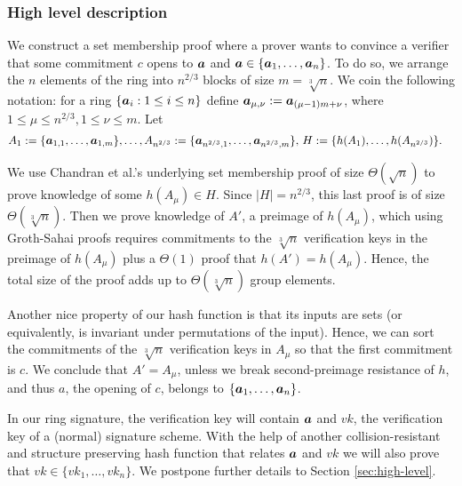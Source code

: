 \subsubsection{High level description}
We construct a set membership proof where a prover wants to convince a verifier that some commitment $c$ opens to ${\boldsymbol{a}}$ and ${\boldsymbol{a}}\in\{{\boldsymbol{a}}_1,\ldots,{\boldsymbol{a}}_n\}$. To do so, we arrange the $n$ elements of the ring into $n^{2/3}$ blocks of size $m=\sqrt[3]{n}$. We coin the following notation: for a ring $\{{\boldsymbol{a}}_i:1\leq i \leq n\}$ define ${\boldsymbol{a}}_{\mu,\nu}:={\boldsymbol{a}}_{(\mu-1)m+\nu}$, where  $1\leq\mu\leq n^{2/3},1\leq \nu\leq m$.  Let
\begin{align*}
& A_1 := \{{\boldsymbol{a}}_{1,1},\ldots,{\boldsymbol{a}}_{1,m}\},\ldots, A_{n^{2/3}} := \{{\boldsymbol{a}}_{n^{2/3},1},\ldots,{\boldsymbol{a}}_{n^{2/3},m}\},\,
H:=\{h(A_1),\ldots,\allowbreak h(A_{n^{2/3}})\}.
\end{align*}

We use Chandran et al.'s underlying set membership proof of size $\Theta(\sqrt{n})$ to prove knowledge of some $h(A_\mu)\in H$. Since $|H|=n^{2/3}$, this last proof is of size $\Theta(\sqrt[3]{n})$. Then we prove knowledge of $A'$, a preimage of $h(A_\mu)$, which using Groth-Sahai proofs requires commitments to the $\sqrt[3]{n}$ verification keys in the preimage of $h(A_\mu)$ plus a $\Theta(1)$ proof that $h(A')=h(A_\mu)$. Hence, the total size of the proof adds up to $\Theta(\sqrt[3]{n})$ group elements.

Another nice property of our hash function is that its inputs are sets (or equivalently, is invariant under permutations of the input). Hence, we can sort the commitments of the $\sqrt[3]{n}$ verification keys in $A_\mu$ so that the first commitment is $c$. We conclude that $A'=A_\mu$, unless we break second-preimage resistance of $h$, and thus $a$, the opening of $c$, belongs to $\{{\boldsymbol{a}}_1,\ldots,{\boldsymbol{a}}_n\}$.

In our ring signature, the verification key will contain ${\boldsymbol{a}}$ and $vk$, the verification key of a (normal) signature scheme. With the help of another collision-resistant and structure preserving hash function that relates ${\boldsymbol{a}}$ and $vk$ we will also prove that $vk\in\{vk_1,\ldots,vk_n\}$. We postpone further details to Section \ref{sec:high-level}.